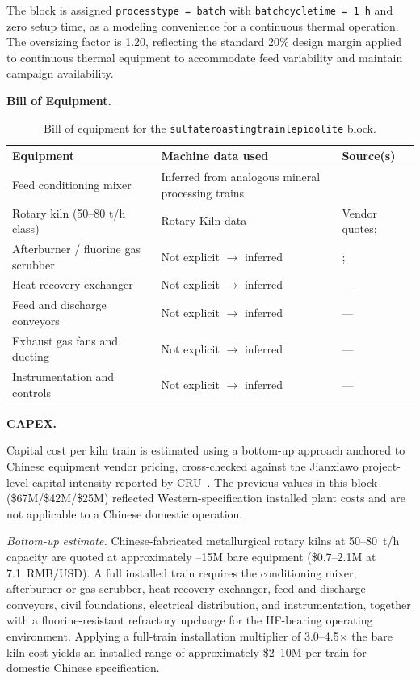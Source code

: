 \documentclass{article}
\renewcommand\_{\textunderscore\allowbreak}
\begin{document}
The block is assigned \texttt{process\_type = batch} with \texttt{batch\_cycle\_time = 1 h} and zero setup time, as a modeling convenience for a continuous thermal operation. The oversizing factor is 1.20, reflecting the standard 20\% design margin applied to continuous thermal equipment to accommodate feed variability and maintain campaign availability.

\medskip
\noindent\textbf{Bill of Equipment.}\quad
\begin{table}[h!]
\caption{Bill of equipment for the \texttt{sulfate\_roasting\_train\_lepidolite} block.}
\centering
\begin{tabular}{>{\raggedright\arraybackslash}p{5.2cm}
                >{\raggedright\arraybackslash}p{4cm}
                >{\raggedright\arraybackslash}p{4.5cm}}
\toprule
\textbf{Equipment} & \textbf{Machine data used} & \textbf{Source(s)} \\
\midrule
Feed conditioning mixer & Inferred from analogous mineral processing trains & \citet{dengSystematicReviewSulfate2026} \\
Rotary kiln (50--80 t/h class) & Rotary Kiln data & Vendor quotes; \citet{jiaoKeyTechnologiesDevelopment2024} \\
Afterburner / fluorine gas scrubber & Not explicit $\rightarrow$ inferred & \citet{dengSystematicReviewSulfate2026}; \citet{yanExtractionLithiumLepidolite2012} \\
Heat recovery exchanger & Not explicit $\rightarrow$ inferred & --- \\
Feed and discharge conveyors & Not explicit $\rightarrow$ inferred & --- \\
Exhaust gas fans and ducting & Not explicit $\rightarrow$ inferred & --- \\
Instrumentation and controls & Not explicit $\rightarrow$ inferred & --- \\
\bottomrule
\end{tabular}
\end{table}

\medskip
\noindent\textbf{CAPEX.}\quad

Capital cost per kiln train is estimated using a bottom-up approach anchored to Chinese equipment vendor pricing, cross-checked against the Jianxiawo project-level capital intensity reported by CRU~\cite{zhangChinaHasDomestic2025}. The previous values in this block (\$67M/\$42M/\$25M) reflected Western-specification installed plant costs and are not applicable to a Chinese domestic operation.
 
\textit{Bottom-up estimate.} Chinese-fabricated metallurgical rotary kilns at 50--80~t/h capacity are quoted at approximately --15M bare equipment (\$0.7--2.1M at 7.1~RMB/USD). A full installed train requires the conditioning mixer, afterburner or gas scrubber, heat recovery exchanger, feed and discharge conveyors, civil foundations, electrical distribution, and instrumentation, together with a fluorine-resistant refractory upcharge for the HF-bearing operating environment. Applying a full-train installation multiplier of 3.0--4.5$\times$ the bare kiln cost yields an installed range of approximately \$2--10M per train for domestic Chinese specification.
 
\end{document}
